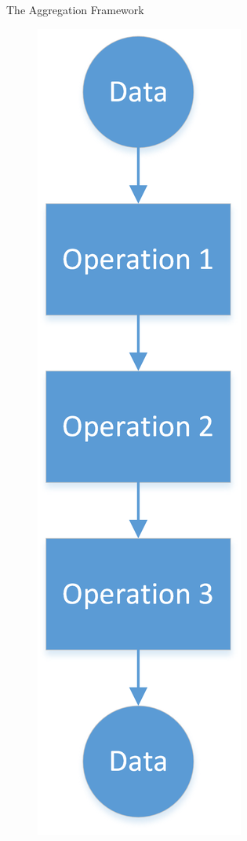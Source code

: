 \documentclass{beamer}
\begin{document}
\begin{frame}{The Aggregation Framework}
\begin{minipage}[t]{0.7\textwidth}
\begin{figure}
        \includegraphics[height=0.6\textheight]{Aggregation-Framework.png}
    \end{figure}

	
\end{minipage}

\end{frame}
\end{document}
